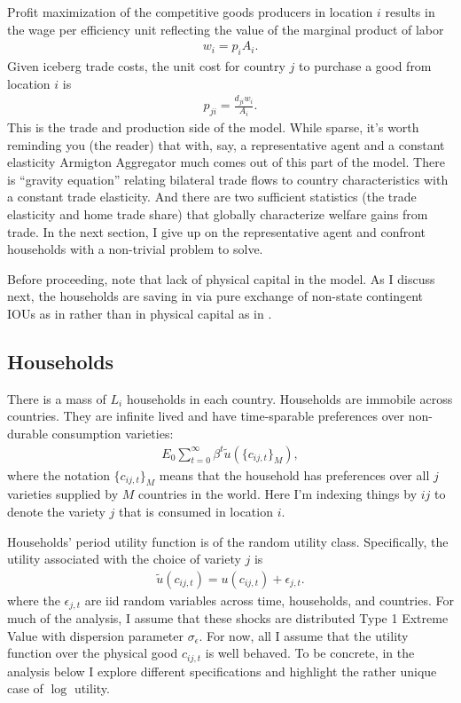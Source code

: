\documentclass[12pt,pdftex]{article}
\begin{document}
\begin{onehalfspacing}
Profit maximization of the competitive goods producers in location $i$ results in the wage per efficiency unit reflecting the value of the marginal product of labor
\begin{align}
w_{i} = p_{i} A_{i}.
\label{eq:marginal-product}
\end{align}
Given iceberg trade costs, the unit cost for country $j$ to purchase a good from location $i$ is
\begin{align}
p_{ji} = \frac{d_{ji}w_{i}}{A_{i}}.
\label{eq:marginal-product-ship}
\end{align}
This is the trade and production side of the model. While sparse, it's worth reminding you (the reader) that with, say, a representative agent and a constant elasticity Armigton Aggregator much comes out of this part of the model. There is ``gravity equation'' relating bilateral trade flows to country characteristics with a constant trade elasticity. And there are two sufficient statistics (the trade elasticity and home trade share) that globally characterize welfare gains from trade. In the next section, I give up on the representative agent and confront households with a non-trivial problem to solve.

Before proceeding, note that lack of physical capital in the model. As I discuss next, the households are saving in via pure exchange of non-state contingent IOUs as in \citet{huggett1993risk} rather than in physical capital as in \citet{aiyagari1994uninsured}.

\subsection{Households}

There is a mass of $L_i$ households in each country. Households are immobile across countries. They are infinite lived and have time-sparable preferences over non-durable consumption varieties:
\begin{align}
E_{0} \sum_{t = 0}^{\infty} \beta^{t} \tilde{u}( \{ c_{ij,t} \}_{M}),
\end{align}
where the notation $\{ c_{ij,t} \}_{M}$ means that the household has preferences over all $j$ varieties supplied by $M$ countries in the world. Here I'm indexing things by $ij$ to denote the variety $j$ that is consumed in location $i$.

Households' period utility function is of the random utility class. Specifically, the utility associated with the choice of variety $j$ is
\begin{align}
\tilde{u}( c_{ij,t} ) =  u(c_{ij,t}) + \epsilon_{j,t}. \label{eq:utility}
\end{align}
where the $\epsilon_{j,t}$ are iid random variables across time, households, and countries. For much of the analysis, I assume that these shocks are distributed Type 1 Extreme Value with dispersion parameter $\sigma_{\epsilon}$. For now, all I assume that the utility function over the physical good $c_{ij,t}$ is well behaved. To be concrete, in the analysis below I explore different specifications and highlight the rather unique case of $\log$ utility.


\end{onehalfspacing}
\end{document}
